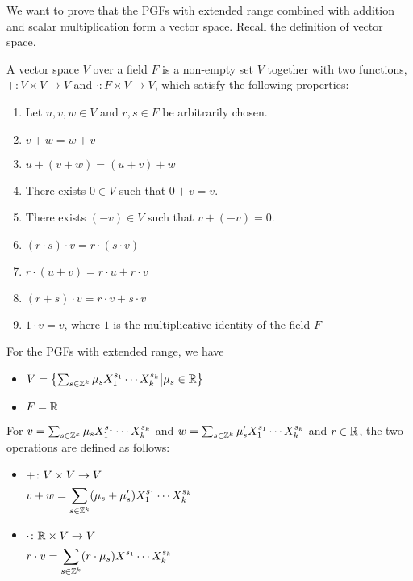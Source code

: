 We want to prove that the PGFs with extended range combined with addition and scalar multiplication form a vector space.
Recall the definition of vector space.
\begin{definition}
	A vector space $V$ over a field $F$ is a non-empty set $V$ together with two functions, 
	$+ \colon V \times V \to V$ and $\cdot \colon F \times V \to V$,
	which satisfy the following properties:
	\begin{enumerate}
		\item[] Let $u, v, w \in V$ and $r, s \in F$ be arbitrarily chosen.
		\item $ v + w = w + v $
		\item $ u + (v + w) = (u + v) + w $
		\item There exists $0 \in V$ such that $ 0 + v = v  $.
		\item There exists $(-v) \in V$ such that $ v + (-v) = 0 $.
		\item $ (r \cdot s) \cdot v = r \cdot (s \cdot v) $
		\item $ r \cdot (u + v) = r \cdot u + r \cdot v $
		\item $ (r + s) \cdot v = r \cdot v + s \cdot v $
		\item $ 1 \cdot v = v $, where $1$ is the multiplicative identity of the field $F$
	\end{enumerate}
\end{definition}
For the PGFs with extended range, we have
\begin{itemize}
	\item $ V = \left\{ \sum_{s \in \mathbb{Z}^k} \mu_s X_1^{s_1} \cdots X_k^{s_k} \middle| \mu_s \in \mathbb{R} \right\} $
	\item $ F = \mathbb{R} $
\end{itemize}
For $v = \sum_{s \in \mathbb{Z}^k} \mu_s X_1^{s_1} \cdots X_k^{s_k}$ and $w = \sum_{s \in \mathbb{Z}^k}\mu_s' X_1^{s_1} \cdots X_k^{s_k}$
and $r \in \mathbb{R}$, the two operations are defined as follows:
\begin{itemize}
	\item $\begin{aligned}[t]
			& + \colon V \times V \to V \\
			& v + w = \sum_{s \in \mathbb{Z}^k} (\mu_s + \mu_s') X_1^{s_1} \cdots X_k^{s_k}
	\end{aligned}$
	\item $\begin{aligned}[t]
			& \cdot \colon \mathbb{R} \times V \to V \\
			& r \cdot v = \sum_{s \in \mathbb{Z}^k} (r \cdot \mu_s) X_1^{s_1} \cdots X_k^{s_k}
		\end{aligned}$
\end{itemize}
